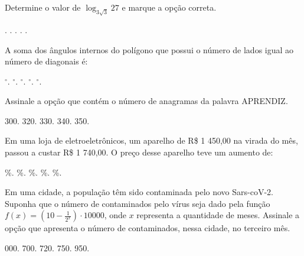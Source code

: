 \begin{question}%
Determine o valor de \(\log_{3\sqrt{3}} 27\) e marque a opção correta.
    \begin{tasks}
        .
        .
        .
        .
        .
    \end{tasks}
\end{question}

\begin{question}%
A soma dos ângulos internos do polígono que possui o número de lados igual ao número de diagonais é:
    \begin{tasks}
        \(^\circ\).
        \(^\circ\).
        \(^\circ\).
        \(^\circ\).
        \(^\circ\).
    \end{tasks}
\end{question}

\begin{question}%
Assinale a opção que contém o número de anagramas da palavra APRENDIZ.
    \begin{tasks}
         300.
         320.
         330.
         340.
         350.
    \end{tasks}
\end{question}

\begin{question}%
Em uma loja de eletroeletrônicos, um aparelho de R\$ 1 450,00 na virada do mês, passou a custar R\$ 1 740,00. O preço desse aparelho teve um aumento de:
    \begin{tasks}
        \%.
        \%.
        \%.
        \%.
        \%.
    \end{tasks}
\end{question}

\begin{question}%
Em uma cidade, a população têm sido contaminada pelo novo Sars-coV-2. Suponha que o número de contaminados pelo vírus seja dado pela função \(f(x) = \left( 10 - \frac{1}{2^x}\right) \cdot 10 000\), onde \(x\) representa a quantidade de meses. Assinale a opção que apresenta o número de contaminados, nessa cidade, no terceiro mês.
    \begin{tasks}
         000.
         700.
         720.
         750.
         950.
    \end{tasks}
\end{question}

